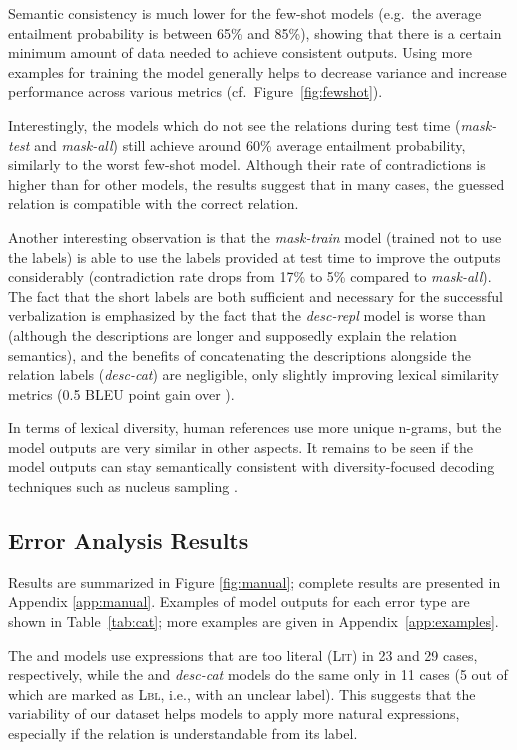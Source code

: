 Semantic consistency is much lower for the few-shot models (e.g.\ the average entailment probability is between 65\% and 85\%), showing that there is a certain minimum amount of data needed to achieve consistent outputs.
Using more examples for training the model generally helps to decrease variance and increase performance across various metrics  (cf.\ Figure~\ref{fig:fewshot}).

Interestingly, the models which do not see the relations during test time (\textit{mask-test} and \textit{mask-all}) still achieve around 60\% average entailment probability, similarly to the worst few-shot model. Although their rate of contradictions is higher than for other models, the results suggest that in many cases, the guessed relation is compatible with the correct relation.

Another interesting observation is that the \textit{mask-train} model (trained not to use the labels) is able to use the labels provided at test time to improve the outputs considerably (contradiction rate drops from 17\% to 5\% compared to \textit{mask-all}).
The fact that the short labels are both sufficient and necessary for the successful verbalization is emphasized by the fact that the \textit{desc-repl} model is worse than \BARTr{} (although the descriptions are longer and supposedly explain the relation semantics), and the benefits of concatenating the descriptions alongside the relation labels (\textit{desc-cat}) are negligible, only slightly improving lexical similarity metrics (0.5 BLEU point gain over \BARTr{}).

In terms of lexical diversity, human references use more unique n-grams, but the model outputs are very similar in other aspects. It remains to be seen if the model outputs can stay semantically consistent with diversity-focused decoding techniques such as nucleus sampling \cite{holtzmanBDFC20}.


\subsection{Error Analysis Results}
Results are summarized in Figure \ref{fig:manual}; complete results are presented in Appendix \ref{app:manual}.
Examples of model outputs for each error type are shown in Table~\ref{tab:cat}; more examples are given in Appendix~\ref{app:examples}.

The \BARTk{} and \BARTw{} models use expressions that are too literal (\textsc{Lit}) in 23 and 29 cases, respectively, while the \BARTr{} and \textit{desc-cat} models do the same only in 11 cases (5 out of which are marked as \textsc{Lbl}, i.e., with an unclear label). This suggests that the variability of our dataset helps models to apply more natural expressions, especially if the relation is understandable from its label.

